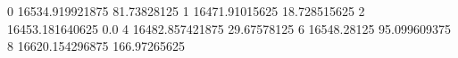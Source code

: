 0 16534.919921875 81.73828125
1 16471.91015625 18.728515625
2 16453.181640625 0.0
4 16482.857421875 29.67578125
6 16548.28125 95.099609375
8 16620.154296875 166.97265625
